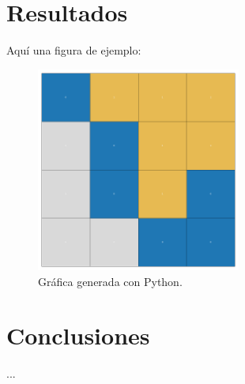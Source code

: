 \documentclass{article}
\begin{document}
\section{Resultados}
Aquí una figura de ejemplo:

\begin{figure}[h]
    \centering
    \includegraphics[width=0.6\textwidth]{figures/clusters.pdf}
    \caption{Gráfica generada con Python.}
\end{figure}



\section{Conclusiones}
...
\end{document}
